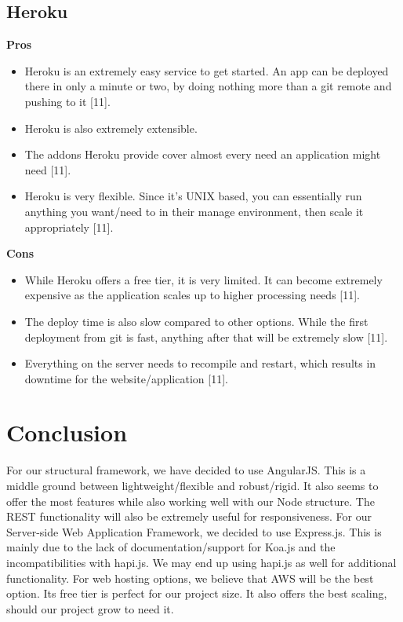 \documentclass[onecolumn, draftclsnofoot,10pt, compsoc]{IEEEtran}
\begin{document}
	\subsection{Heroku}	
		\textbf{Pros} 
			\begin{itemize}
				\item Heroku is an extremely easy service to get started. An app can be deployed there in only a minute or two, by doing nothing more than a git remote and pushing to it [11]. 
				\item Heroku is also extremely extensible.
				\item The addons Heroku provide cover almost every need an application might need [11]. 
				\item Heroku is very flexible. Since it's UNIX based, you can essentially run anything you want/need to in their manage environment, then scale it appropriately [11].
			\end{itemize}
		\textbf{Cons}
			\begin{itemize}
				\item While Heroku offers a free tier, it is very limited. It can become extremely expensive as the application scales up to higher processing needs [11]. 
				\item The deploy time is also slow compared to other options. While the first deployment from git is fast, anything after that will be extremely slow [11]. 
				\item Everything on the server needs to recompile and restart, which results in downtime for the website/application [11].
			\end{itemize}
			
			
\section{Conclusion}

For our structural framework, we have decided to use AngularJS. This is a middle ground between lightweight/flexible and robust/rigid. It also seems to offer the most features while also working well with our Node structure. The REST functionality will also be extremely useful for responsiveness. For our Server-side Web Application Framework, we decided to use Express.js. This is mainly due to the lack of documentation/support for Koa.js and the incompatibilities with hapi.js. We may end up using hapi.js as well for additional functionality. For web hosting options, we believe that AWS will be the best option. Its free tier is perfect for our project size. It also offers the best scaling, should our project grow to need it.
\end{document}
